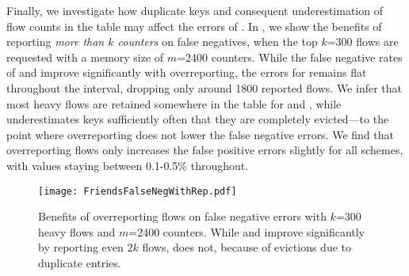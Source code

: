  Finally, we investigate how
duplicate keys and consequent underestimation of flow counts in the table may
affect the errors of \TheSystem. In , we show
the benefits of reporting {\em more than $k$ counters} on false negatives, when
the top $k$=300 flows are requested with a memory size of $m$=2400 counters.
While the false negative rates of \spacesaving and \Baseline improve
significantly with overreporting, the errors for \TheSystem remains flat
throughout the interval, dropping only around 1800 reported flows. We infer that
most heavy flows are retained somewhere in the table for \spacesaving and
\Baseline, while \TheSystem underestimates keys sufficiently often that they are
completely evicted---to the point where overreporting does not lower the false
negative errors.
%
We find that overreporting
flows only increases the false positive errors slightly for all schemes, with
values staying between 0.1-0.5\% throughout.

\begin{figure}[h]
\texttt{[image: FriendsFalseNegWithRep.pdf]}
\caption{Benefits of overreporting flows on false negative errors
  with $k$=300 heavy flows and $m$=2400 counters. While \spacesaving and
  \Baseline improve significantly by reporting even $2k$ flows,
  \TheSystem does not, because of evictions due to duplicate entries.}
\label{fig:reportingMoreThanK-falseneg}
\end{figure}

\iffalse
\begin{figure}[h]
\texttt{[image: FriendsFalsePosWithRep.pdf]}
\caption{Impact of overreporting flows from the table on false positive errors
  with $k$=300 heavy flows and $m$=2400 flows. %
  }
\label{fig:reportingMoreThanK-falsepos}
\end{figure}
\fi





